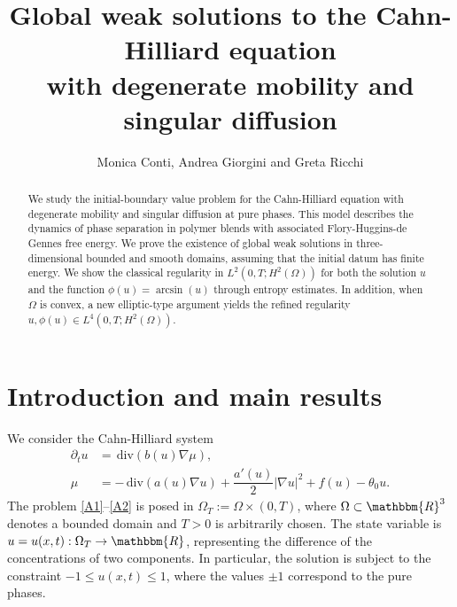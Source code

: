 \documentclass[11pt,  reqno]{amsart}%
\theoremstyle{plain}
\theoremstyle{definition}
\theoremstyle{remark}
\numberwithin{equation}{section}
\def\div{\,\mathrm{div}}
\begin{document}
	\title{Global weak solutions to the Cahn-Hilliard equation \\ 
    with degenerate mobility and singular diffusion}

\author[Monica Conti, Andrea Giorgini and Greta Ricchi]{Monica Conti, Andrea Giorgini and Greta Ricchi}

\address{Politecnico di Milano\\
Dipartimento di Matematica\\
Via E. Bonardi 9, I-20133 Milano, Italy\\
\href{mailto:monicaconti@polimi.it}{monica.conti@polimi.it},
\href{mailto:andrea.giorgini@polimi.it}{andrea.giorgini@polimi.it},
\href{mailto:greta.ricchi@polimi.it}{greta.ricchi@polimi.it}}

\begin{abstract}
We study the initial-boundary value problem for the Cahn-Hilliard equation with degenerate mobility and singular diffusion at pure phases. 
This model describes the dynamics of phase separation in polymer blends with associated Flory-Huggins-de Gennes free energy. 
We prove the existence of global weak solutions in three-dimensional bounded and smooth domains, assuming that the initial datum has finite energy. 
We show the classical regularity in $L^2(0,T;H^2(\Omega))$ for both the solution $u$ and the function $\phi(u)=\arcsin(u)$ through entropy estimates.
In addition, when $\Omega$ is convex, a new elliptic-type argument yields the refined regularity $u, \phi(u) \in L^4(0,T; H^2(\Omega))$.
\end{abstract}

\maketitle 

\setcounter{tocdepth}{1}
\tableofcontents

\section{Introduction and main results}

We consider the Cahn-Hilliard system
 \begin{align}
\partial_t u  &= \div(b(u) \nabla \mu ), \label{A1}\\
\mu&= - \div \left( a(u) \nabla u \right) + \dfrac{a'(u)}{2} |\nabla u |^2 + f(u) -\theta_0 u.\label{A2}
 \end{align} 
The problem \eqref{A1}--\eqref{A2} is posed in $\Omega_T:=\Omega \times (0,T)$, where $\Omega \subset \mathbbm{R}^3$ denotes a bounded domain and $T>0$ is arbitrarily chosen. 
The state variable is $u= u(x,t): \Omega_T \to \mathbbm{R}$, representing the difference of the concentrations of two components. In particular, the solution is subject to the constraint $-1\leq u(x,t) \leq 1$, where the values $\pm 1$ correspond to the pure phases. 
\end{document}
